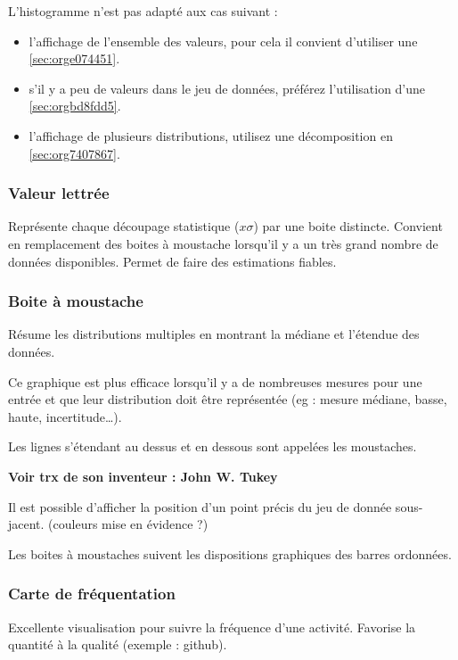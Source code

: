 \documentclass[a4paper,12pt]{article}
\begin{document}
\begin{multicols}{2}
L'histogramme n'est pas adapté aux cas suivant :
\begin{itemize}
\item l'affichage de l'ensemble des valeurs, pour cela il convient d'utiliser une \ref{sec:orge074451}. \autocite{wilkeVisualizingDistributionsHistograms2019}
\item s'il y a peu de valeurs dans le jeu de données, \autocite{weissgerberBarLineGraphs2015} préférez l'utilisation d'une \ref{sec:orgbd8fdd5}.
\item l'affichage de plusieurs distributions,\autocite{wilkeVisualizingDistributionsHistograms2019} utilisez une décomposition en \ref{sec:org7407867}.
\end{itemize}
\subsubsection{Valeur lettrée}
\label{sec:orge39f343}
Représente chaque découpage statistique (\(x\sigma\)) par une boite distincte. Convient en remplacement des boites à moustache lorsqu'il y a un très grand nombre de données disponibles. Permet de faire des estimations fiables. \autocite{hofmannLettervaluePlotsBoxplots2017,mikeyiHowChooseRight2020}
\subsubsection{Boite à moustache}
\label{sec:org81dfebb}
Résume les distributions multiples en montrant la médiane et l'étendue des données. \autocite{alansmithLexiqueVisuel}

Ce graphique est plus efficace lorsqu'il y a de nombreuses mesures pour une entrée et que leur distribution doit être représentée (eg : mesure médiane, basse, haute, incertitude\ldots{}). \autocite{mikeyiHowChooseRight2020}

Les lignes s'étendant au dessus et en dessous sont appelées les moustaches. \autocite{wilkeVisualizingManyDistributions2019}

\textbf{Voir trx de son inventeur : John W. Tukey}

Il est possible d'afficher la position d'un point précis du jeu de donnée sous-jacent. (couleurs mise en évidence ?)

Les boites à moustaches suivent les dispositions graphiques des barres ordonnées. \autocite{stephenfewComponentlevelGraphDesign2012}
\subsubsection{Carte de fréquentation}
\label{sec:org2df0d1c}
Excellente visualisation pour suivre la fréquence d'une activité. Favorise la quantité à la qualité (exemple : github). \autocite{alansmithLexiqueVisuel}

\end{multicols}
\end{document}
